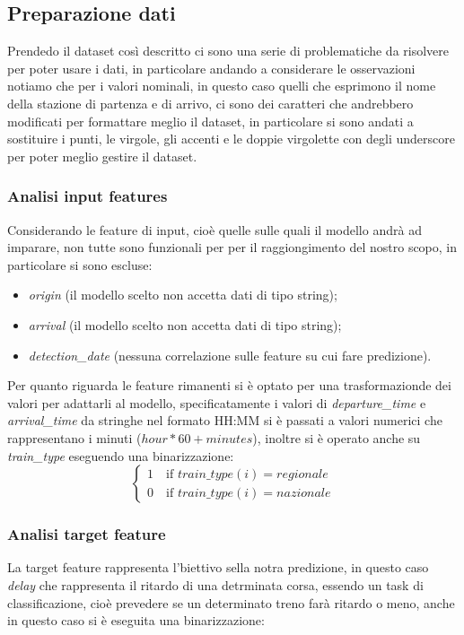 \documentclass[italian,12pt,a4paper]{article}
\begin{document}
	\subsection{Preparazione dati}
		Prendedo il dataset così descritto ci sono una serie di problematiche da risolvere per poter usare i dati, in particolare andando a considerare le osservazioni notiamo che per i valori nominali, in questo caso quelli che esprimono il nome della stazione di partenza e di arrivo, ci sono dei caratteri che andrebbero modificati per formattare meglio il dataset, in particolare si sono andati a sostituire i punti, le virgole, gli accenti e le doppie virgolette con degli underscore per poter meglio gestire il dataset.
		
		\subsubsection{Analisi input features}
			Considerando le feature di input, cioè quelle sulle quali il modello andrà ad imparare, non tutte sono funzionali per per il raggiongimento del nostro scopo, in particolare si sono escluse:
			
			\begin{itemize}
				\item \textit{origin} (il modello scelto non accetta dati di tipo string);
				\item \textit{arrival} (il modello scelto non accetta dati di tipo string);
				\item \textit{detection\_date} (nessuna correlazione sulle feature su cui fare predizione).
			\end{itemize}
			Per quanto riguarda le feature rimanenti si è optato per una trasformazionde dei valori per adattarli al modello, specificatamente i valori di \textit{departure\_time} e \textit{arrival\_time} da stringhe nel formato HH:MM si è passati a valori numerici che rappresentano i minuti ($hour*60+minutes$), inoltre si è operato anche su \textit{train\_type} eseguendo una binarizzazione:
			\begin{equation*}
				\begin{cases}
					1 \quad \text{if } train\_type(i) = regionale \\
					0 \quad \text{if } train\_type(i) = nazionale
				\end{cases}
			\end{equation*}
			
		\subsubsection{Analisi target feature}
			La target feature rappresenta l'biettivo sella notra predizione, in questo caso \textit{delay} che rappresenta il ritardo di una detrminata corsa, essendo un task di classificazione, cioè prevedere se un determinato treno farà ritardo o meno, anche in questo caso si è eseguita una binarizzazione:
			
\end{document}
